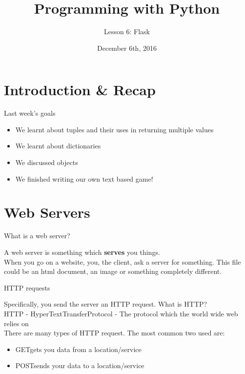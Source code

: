 \documentclass{beamer}
\title{Programming with Python}
\subtitle{Lesson 6: Flask}
\date{December 6th, 2016}
\begin{document}
\begin{frame}
  \titlepage
\end{frame}


\section{Introduction \& Recap}

\begin{frame}{Last week's goals}
\pause
  \begin{itemize}
  \item We learnt about tuples and their uses in returning multiple values\pause
  \item We learnt about dictionaries\pause
  \item We discussed objects\pause
  \item We finished writing our own text based game!
  \end{itemize}  
\end{frame}

\section{Web Servers}

\begin{frame}{What is a web server?}

\pause
A web server is \pause something which \textbf{serves} you things. \pause \\

When you go on a website, you, the client, ask a server for something.\pause
This file could be an html document, an image or something completely different.

\end{frame}

\begin{frame}{HTTP requests}

\pause Specifically, you send the server an HTTP request. What is HTTP? \pause \\
HTTP - HyperTextTransferProtocol \pause - The protocol which the world wide web relies on \\

\pause There are many types of HTTP request. The most common two used are:
\begin{itemize}
  \item[] GET\pause \qquad gets you data from a location/service\pause
   \item[] POST\pause \qquad sends your data to a location/service
\end{itemize}

\end{frame}
\end{document}
